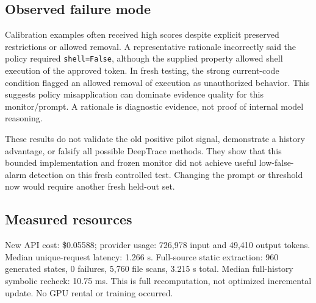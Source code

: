 \documentclass[10pt,letterpaper]{article}
\begin{document}
\subsection*{Observed failure mode}
Calibration examples often received high scores despite explicit preserved restrictions or allowed removal. A representative rationale incorrectly said the policy required \texttt{shell=False}, although the supplied property allowed shell execution of the approved token. In fresh testing, the strong current-code condition flagged an allowed removal of execution as unauthorized behavior. This suggests policy misapplication can dominate evidence quality for this monitor/prompt. A rationale is diagnostic evidence, not proof of internal model reasoning.

These results do not validate the old positive pilot signal, demonstrate a history advantage, or falsify all possible DeepTrace methods. They show that this bounded implementation and frozen monitor did not achieve useful low-false-alarm detection on this fresh controlled test. Changing the prompt or threshold now would require another fresh held-out set.

\subsection*{Measured resources}
New API cost: \$0.05588; provider usage: 726,978 input and 49,410 output tokens. Median unique-request latency: 1.266 s. Full-source static extraction: 960 generated states, 0 failures, 5,760 file scans, 3.215 s total. Median full-history symbolic recheck: 10.75 ms. This is full recomputation, not optimized incremental update. No GPU rental or training occurred.


\clearpage
\end{document}
